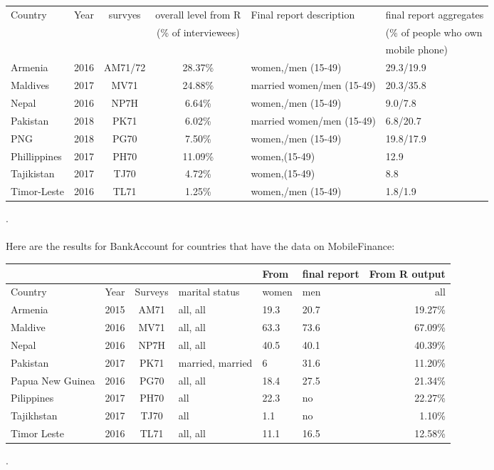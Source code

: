 \documentclass[12pt]{article}
\begin{document}
{\small 
	\begin{tabular}{lcccll}
	\hline
	Country& Year& survyes & overall level from R & Final report  description & final report aggregates \\
	& & & (\% of interviewees)& &  (\% of people who own \\
	& & & & & mobile phone)\\
	  \hline 
Armenia & 2016 & AM71/72 & 28.37\% & women,/men (15-49) & 29.3/19.9 \\
Maldives & 2017 & MV71 & 24.88\% & married women/men (15-49) & 20.3/35.8 \\
Nepal & 2016 & NP7H & 6.64\% & women,/men (15-49) & 9.0/7.8 \\
Pakistan & 2018 & PK71 & 6.02\% & married women/men (15-49) & 6.8/20.7 \\
PNG & 2018 & PG70 & 7.50\% & women,/men (15-49) & 19.8/17.9 \\
Phillippines & 2017 & PH70 & 11.09\% & women,(15-49) & 12.9 \\
Tajikistan & 2017 & TJ70 & 4.72\% & women,(15-49) & 8.8 \\
Timor-Leste & 2016 & TL71 & 1.25\% & women,/men (15-49) & 1.8/1.9 \\
\hline
	\end{tabular}
}
.
\\
\\
Here are the results for BankAccount for countries that have the data on MobileFinance:

{\small 
	\begin{tabular}{lcclllr}
		\hline
  &  &  &  &   From & final report  & From R output \\
  \hline
Country & Year & Surveys & marital status & women & men & all \\
Armenia & 2015 & AM71 & all, all & 19.3 & 20.7 & 19.27\% \\
Maldive & 2016 & MV71 & all, all & 63.3 & 73.6 & 67.09\% \\
Nepal & 2016 & NP7H & all, all & 40.5 & 40.1 & 40.39\% \\
Pakistan & 2017 & PK71 & married, married & 6 & 31.6 & 11.20\% \\
Papua New Guinea & 2016 & PG70 & all, all & 18.4 & 27.5 & 21.34\% \\
Pilippines & 2017 & PH70 & all & 22.3 & no & 22.27\% \\
Tajikhstan & 2017 & TJ70 & all & 1.1 & no & 1.10\% \\
Timor Leste & 2016 & TL71 & all, all & 11.1 & 16.5 & 12.58\% \\
\hline
	\end{tabular}
}
.
\\
\\
\end{document}
